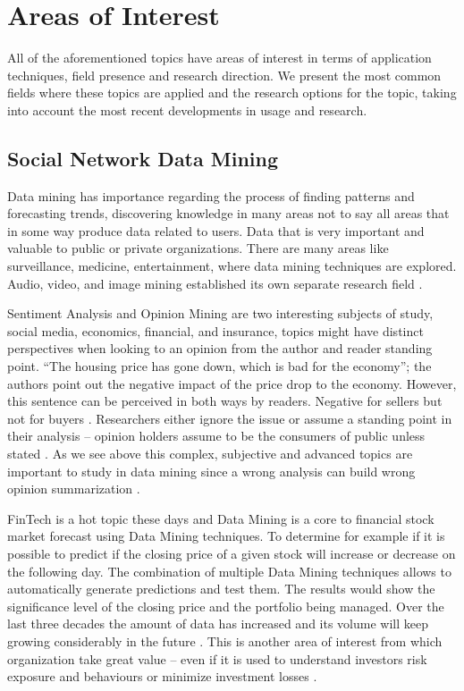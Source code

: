 \documentclass[runningheads]{llncs}
\begin{document}
\section{Areas of Interest}

All of the aforementioned topics have areas of interest in terms of application techniques, field presence and research direction. We present the most common fields where these topics are applied and the research options for the topic, taking into account the most recent developments in usage and research.

\subsection{Social Network Data Mining}

Data mining has importance regarding the process of finding patterns and forecasting trends, discovering knowledge in many areas not to say all areas that in some way produce data related to users. Data that is very important and valuable to public or private organizations. There are many areas like surveillance, medicine, entertainment, where data mining techniques are explored. Audio, video, and image mining established its own separate research field \cite{Bharati}.

Sentiment Analysis and Opinion Mining are two interesting subjects of study, social media, economics, financial, and insurance, topics might have distinct perspectives when looking to an opinion from the author and reader standing point. “The housing price has gone down, which is bad for the economy”; the authors point out the negative impact of the price drop to the economy. However, this sentence can be perceived in both ways by readers. Negative for sellers but not for buyers \cite{doi:10.2200/S00416ED1V01Y201204HLT016}. Researchers either ignore the issue or assume a standing point in their analysis – opinion holders assume to be the consumers of public unless stated \cite{doi:10.2200/S00416ED1V01Y201204HLT016}. As we see above this complex, subjective and advanced topics are important to study in data mining since a wrong analysis can build wrong opinion summarization \cite{doi:10.2200/S00416ED1V01Y201204HLT016}.

FinTech is a hot topic these days and Data Mining is a core to financial stock market forecast using Data Mining techniques. To determine for example if it is possible to predict if the closing price of a given stock will increase or decrease on the following day. The combination of multiple Data Mining techniques allows to automatically generate predictions and test them. The results would show the significance level of the closing price and the portfolio being managed. Over the last three decades the amount of data has increased and its volume will keep growing considerably in the future \cite{kannan}. This is another area of interest from which organization take great value – even if it is used to understand investors risk exposure and behaviours or minimize investment losses \cite{kannan}.
\end{document}
